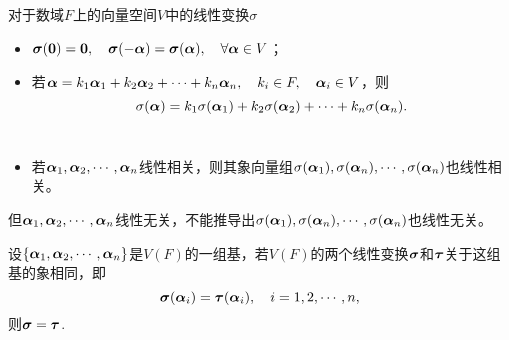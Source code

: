 \begin{frame} 
  对于数域$F$上的向量空间$V$中的线性变换$\sigma$
  
  \begin{itemize}
  \item $\sigmabd(\M0)=\M0, \quad \sigmabd(-\alphabd)=\sigmabd(\alphabd), \quad \forall\alphabd\in V$；\\[.1in]
  \item 若$\boldsymbol{\alpha}=k_1\boldsymbol{\alpha}_1+k_2\boldsymbol{\alpha}_2+\cdots+k_n\boldsymbol{\alpha}_n, \quad k_i\in F, \quad \boldsymbol{\alpha}_i\in V$，则
    $$
    \sigma(\boldsymbol{\alpha})=k_1\sigma(\boldsymbol{\alpha}_1)+k_2\sigma(\boldsymbol{\alpha}_2)+\cdots+k_n\sigma(\boldsymbol{\alpha}_n).
    $$ \\[.1in]
  \item 若$\boldsymbol{\alpha}_1, \boldsymbol{\alpha}_2, \cdots, \boldsymbol{\alpha}_n$线性相关，则其象向量组$\sigma(\boldsymbol{\alpha}_1),\sigma(\boldsymbol{\alpha}_n),\cdots,\sigma(\boldsymbol{\alpha}_n)$也线性相关。
  \end{itemize}

  \vspace{.1in}
   

  \begin{zhu}
    但$\boldsymbol{\alpha}_1, \boldsymbol{\alpha}_2, \cdots, \boldsymbol{\alpha}_n$线性无关，不能推导出$\sigma(\boldsymbol{\alpha}_1),\sigma(\boldsymbol{\alpha}_n),\cdots,\sigma(\boldsymbol{\alpha}_n)$也线性无关。
  \end{zhu}
\end{frame}

\begin{frame}
  \begin{dingli}
    设$\{\boldsymbol{\alpha}_1,\boldsymbol{\alpha}_2,\cdots,\boldsymbol{\alpha}_n\}$是$V(F)$的一组基，若$V(F)$的两个线性变换$\boldsymbol{\sigma}$和$\boldsymbol{\tau}$关于这组基的象相同，即
    $$
    \boldsymbol{\sigma}(\boldsymbol{\alpha}_i)=\boldsymbol{\tau}(\boldsymbol{\alpha}_i), \quad i=1,2,\cdots,n,
    $$
    则$\boldsymbol{\sigma}=\boldsymbol{\tau}$.
  \end{dingli}
\end{frame}

